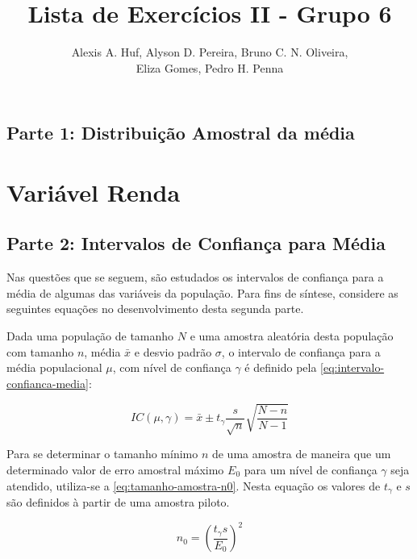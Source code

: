 \documentclass[10pt,a4paper,oneside]{article}
\author{%
	Alexis A. Huf, %
	Alyson D. Pereira, %
	Bruno C. N. Oliveira,\\%
	Eliza Gomes, %
	Pedro H. Penna
	}
\title{Lista de Exercícios II - Grupo 6}
\begin{document}
\maketitle

\begin{center}
 	\section*{Parte 1: Distribuição Amostral da média}
 \end{center}

 \section{Variável Renda}
 \label{questao:1}
 

 \begin{center}
 	\section*{Parte 2: Intervalos de Confiança para Média}
 \end{center}

	Nas questões que se seguem, são estudados os intervalos de confiança
	para a média de algumas das variáveis da população. Para fins de síntese,
	considere as seguintes equações no desenvolvimento desta segunda parte.

	Dada uma população de tamanho $N$ e uma amostra aleatória desta população
	com tamanho $n$, média $\bar{x}$ e desvio padrão $\sigma$, o intervalo de 
	confiança para a média populacional $\mu$, com nível de confiança $\gamma$
	é definido pela \autoref{eq:intervalo-confianca-media}:

	\begin{equation}
		\label{eq:intervalo-confianca-media}
		IC (\mu, \gamma) = \bar{x} \pm t_\gamma \frac{s}{\sqrt{n}} \sqrt{\frac{N-n}{N-1}}
	\end{equation}

	Para se determinar o tamanho mínimo $n$ de uma amostra de maneira que
	um determinado valor de erro amostral máximo $E_{0}$ para um nível de
	confiança $\gamma$ seja atendido, utiliza-se a \autoref{eq:tamanho-amostra-n0}.
	Nesta equação os valores de $t_{\gamma}$ e $s$ são definidos à partir
	de uma amostra piloto.

	\begin{equation}
		\label{eq:tamanho-amostra-n0}
		 n_0 = \left (\frac{t_\gamma s}{E_0} \right)^2
	\end{equation}
\end{document}
